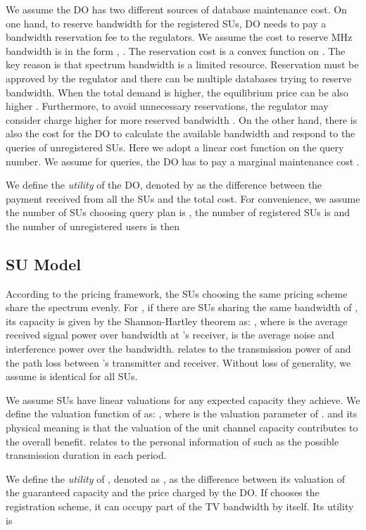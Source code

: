\documentclass[journal]{IEEEtran}
\begin{document}
We assume the DO has two different sources of database maintenance cost. On one hand, to reserve bandwidth for the registered SUs, DO needs to pay a bandwidth reservation fee to the regulators. We assume the cost to reserve  MHz bandwidth is in the form , . The reservation cost is a convex function on . The key reason is that spectrum bandwidth is a limited resource. Reservation must be approved by the regulator and there can be multiple databases trying to reserve bandwidth. When the total demand is higher, the equilibrium price can be also higher \cite{reservation_price}. Furthermore, to avoid unnecessary reservations, the regulator may consider charge higher for more reserved bandwidth \cite{ReserveOfcom}. On the other hand, there is also the cost for the DO to calculate the available bandwidth and respond to the queries of unregistered SUs. Here we adopt a linear cost function on the query number. We assume for  queries, the DO has to pay a marginal maintenance cost .

We define the \emph{utility} of the DO, denoted by  as the difference between the payment received from all the SUs and the total cost. For convenience, we assume the number of SUs choosing query plan  is , the number of registered SUs is  and the number of unregistered users is  then


\subsection{SU Model}
\label{subsec:SU}

According to the pricing framework, the SUs choosing the same pricing scheme share the spectrum evenly. For , if there are  SUs sharing the same bandwidth of , its capacity is given by the Shannon-Hartley theorem as:
, where  is the average received signal power over bandwidth  at 's receiver,  is the average noise and interference power over the bandwidth.  relates to the transmission power of  and the path loss between 's transmitter and receiver. Without loss of generality, we assume  is identical for all SUs.

We assume SUs have linear valuations for any expected capacity they achieve. We define the valuation function of  as:
, where  is the valuation parameter of .  and its physical meaning is that the valuation of the unit channel capacity contributes to the overall benefit.  relates to the personal information of  such as the possible transmission duration in each period.

We define the \emph{utility} of , denoted as , as the difference between its valuation of the guaranteed capacity and the price charged by the DO. If  chooses the registration scheme, it can occupy part of the TV bandwidth by itself. Its utility is
\end{document}
